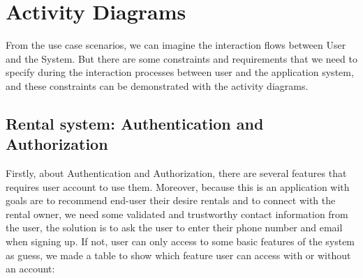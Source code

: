 \newpage
\section{Activity Diagrams}
From the use case scenarios, we can imagine the interaction flows between User and the System. But there are some constraints and requirements that we need to specify during the interaction processes between user and the application system, and these constraints can be demonstrated with the activity diagrams.
\subsection{Rental system: Authentication and Authorization}
Firstly, about Authentication and Authorization, there are several features that requires user account to use them. Moreover, because this is an application with goals are to recommend end-user their desire rentals and to connect with the rental owner, we need some validated and trustworthy contact information from the user, the solution is to ask the user to enter their phone number and email when signing up. If not, user can only access to some basic features of the system as guess, we made a table to show which feature user can access with or without an account:

